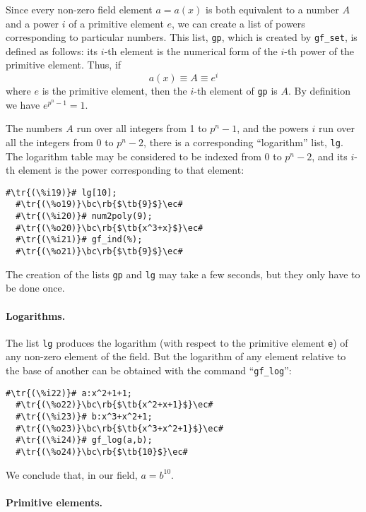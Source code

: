 \documentclass[a4paper,11pt,leqno,fleqn]{artikel3}
\newcommand{\bc}{\begin{center}}
\newcommand{\ec}{\end{center}}
\newcommand{\tr}[1]{\textcolor{red}{#1}}
\newcommand{\tb}[1]{\textcolor{blue}{#1}}
\newcommand{\rb}[1]{\raisebox{2mm}[0mm][1mm]{#1}}
\begin{document}
Since every non-zero field element $a=a(x)$ is both equivalent to a number $A$
and a power $i$ of a primitive element $e$, we can create a list of powers
corresponding to particular numbers.  This list, \texttt{gp}, which is created
by \verb!gf_set!, is defined as follows: its $i$-th element is the numerical
form of the $i$-th power of the primitive element.  Thus, if
\[
a(x)\equiv A\equiv e^i
\]
where $e$ is the primitive element, then the $i$-th element of \texttt{gp} is
$A$.  By definition we have $e^{p^n-1}=1$.

The numbers $A$ run over all integers from 1 to $p^n-1$, and the powers $i$
run over all the integers from 0 to $p^n-2$, there is a corresponding
``logarithm'' list, \texttt{lg}.  The logarithm table may be considered to be
indexed from 0 to $p^n-2$, and its $i$-th element is the power corresponding
to that element:

\begin{lstlisting}[escapechar=\#]
  #\tr{(\%i19)}# lg[10];
  #\tr{(\%o19)}\bc\rb{$\tb{9}$}\ec#
  #\tr{(\%i20)}# num2poly(9);
  #\tr{(\%o20)}\bc\rb{$\tb{x^3+x}$}\ec#
  #\tr{(\%i21)}# gf_ind(%);
  #\tr{(\%o21)}\bc\rb{$\tb{9}$}\ec#
\end{lstlisting}

The creation of the lists \texttt{gp} and \texttt{lg} may take a few seconds,
but they only have to be done once.

\paragraph{Logarithms.}

The list \texttt{lg} produces the logarithm (with respect to the primitive
element \texttt{e}) of any non-zero element of the field.  But the logarithm
of any element relative to the base of another can be obtained with the
command ``\verb!gf_log!'':

\begin{lstlisting}[escapechar=\#]
  #\tr{(\%i22)}# a:x^2+1+1;
  #\tr{(\%o22)}\bc\rb{$\tb{x^2+x+1}$}\ec#
  #\tr{(\%i23)}# b:x^3+x^2+1;
  #\tr{(\%o23)}\bc\rb{$\tb{x^3+x^2+1}$}\ec#
  #\tr{(\%i24)}# gf_log(a,b);
  #\tr{(\%o24)}\bc\rb{$\tb{10}$}\ec#
\end{lstlisting}

We conclude that, in our field, $a=b^{10}$.

\paragraph{Primitive elements.}
\end{document}

